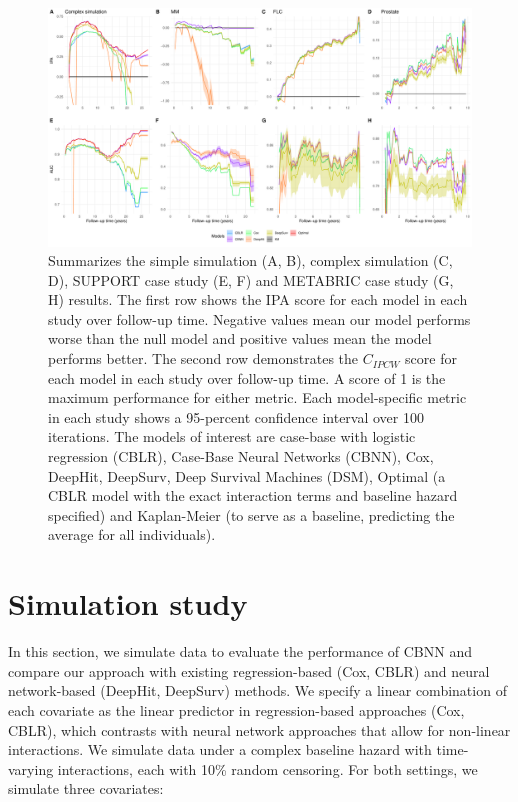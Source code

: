 \documentclass[APA,LATO1COL]{WileyNJD-v2}
\begin{document}
\begin{figure}

{\centering \includegraphics[width=1\linewidth]{../../../analyses/figures/megaPlot} 

}

\caption{Summarizes the simple simulation (A, B), complex simulation (C, D), SUPPORT case study (E, F) and METABRIC case study (G, H) results. The first row shows the IPA score for each model in each study over follow-up time. Negative values mean our model performs worse than the null model and positive values mean the model performs better. The second row demonstrates the $C_{IPCW}$ score for each model in each study over follow-up time. A score of 1 is the maximum performance for either metric. Each model-specific metric in each study shows a 95-percent confidence interval over 100 iterations. The models of interest are case-base with logistic regression (CBLR), Case-Base Neural Networks (CBNN), Cox, DeepHit, DeepSurv, Deep Survival Machines (DSM), Optimal (a CBLR model with the exact interaction terms and baseline hazard specified) and Kaplan-Meier (to serve as a baseline, predicting the average for all individuals).}\label{fig:megaPlot}
\end{figure}

\hypertarget{sims}{%
\section{Simulation study}\label{sims}}

In this section, we simulate data to evaluate the performance of
CBNN and compare our approach with existing regression-based (Cox, CBLR)
and neural network-based (DeepHit, DeepSurv) methods. We specify a
linear combination of each covariate as the linear predictor in
regression-based approaches (Cox, CBLR), which contrasts with neural
network approaches that allow for non-linear interactions. We simulate
data under a complex baseline hazard with
time-varying interactions, each with 10\% random censoring. For both
settings, we simulate three covariates:
\end{document}
